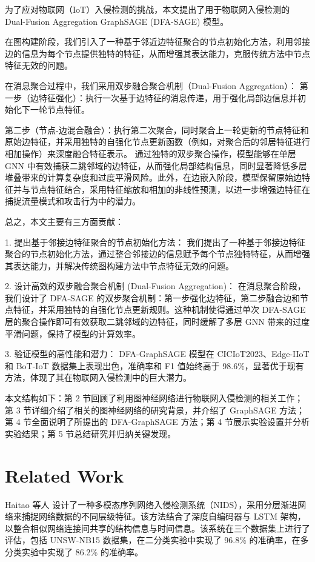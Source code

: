 \documentclass{article}
\begin{document}
为了应对物联网（IoT）入侵检测的挑战，本文提出了用于物联网入侵检测的 Dual-Fusion Aggregation GraphSAGE
(DFA-SAGE) 模型。

在图构建阶段，我们引入了一种基于邻近边特征聚合的节点初始化方法，利用邻接边的信息为每个节点提供独特的特征，从而增强其表达能力，克服传统方法中节点特征无效的问题。

在消息聚合过程中，我们采用双步融合聚合机制（Dual-Fusion Aggregation）：
第一步（边特征强化）：执行一次基于边特征的消息传递，用于强化局部边信息并初始化下一轮节点特征。

第二步（节点-边混合融合）：执行第二次聚合，同时聚合上一轮更新的节点特征和原始边特征，并采用独特的自强化节点更新函数（例如，对聚合后的邻居特征进行相加操作）来深度融合特征表示。
通过独特的双步聚合操作，模型能够在单层 GNN
中有效捕获二跳邻域的边特征，从而强化局部结构信息，同时显著降低多层堆叠带来的计算复杂度和过度平滑风险。此外，在边嵌入阶段，模型保留原始边特征并与节点特征结合，采用特征缩放和相加的非线性预测，以进一步增强边特征在捕捉流量模式和攻击行为中的潜力。

总之，本文主要有三方面贡献：

1. 提出基于邻接边特征聚合的节点初始化方法：
我们提出了一种基于邻接边特征聚合的节点初始化方法，通过整合邻接边的信息赋予每个节点独特特征，从而增强其表达能力，并解决传统图构建方法中节点特征无效的问题。

2. 设计高效的双步融合聚合机制 (Dual-Fusion Aggregation)： 在消息聚合阶段，我们设计了 DFA-SAGE
的双步聚合机制：第一步强化边特征，第二步融合边和节点特征，并采用独特的自强化节点更新规则。这种机制使得通过单次 DFA-SAGE
层的聚合操作即可有效获取二跳邻域的边特征，同时缓解了多层 GNN 带来的过度平滑问题，保持了模型的计算效率。

3. 验证模型的高性能和潜力： DFA-GraphSAGE 模型在 CICIoT2023、Edge-IIoT 和 BoT-IoT
数据集上表现出色，准确率和 F1 值始终高于 98.6\%，显著优于现有方法，体现了其在物联网入侵检测中的巨大潜力。

本文结构如下：第 2 节回顾了利用图神经网络进行物联网入侵检测的相关工作；第 3 节详细介绍了相关的图神经网络的研究背景，并介绍了
GraphSAGE 方法；第 4 节全面说明了所提出的 DFA-GraphSAGE 方法；第 4 节展示实验设置并分析实验结果；第 5
节总结研究并归纳关键发现。

\section{Related Work}

Haitao 等人 \cite{He2019}
设计了一种多模态序列网络入侵检测系统（NIDS），采用分层渐进网络来捕捉网络数据的不同层级特征。该方法结合了深度自编码器与 LSTM
架构，以整合相似网络连接间共享的结构信息与时间信息。该系统在三个数据集上进行了评估，包括 UNSW-NB15 数据集，在二分类实验中实现了
96.8\% 的准确率，在多分类实验中实现了 86.2\% 的准确率。
\end{document}
